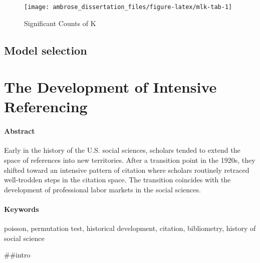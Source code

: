 \documentclass[]{book}
\theoremstyle{definition}
\theoremstyle{definition}
\theoremstyle{definition}
\theoremstyle{remark}
\begin{document}
\begin{figure}

{\centering \texttt{[image: ambrose\_dissertation\_files/figure-latex/mlk-tab-1]} 

}

\caption{Significant Counts of K}\label{fig:mlk-tab}
\end{figure}

\hypertarget{model-selection}{%
\section{Model selection}\label{model-selection}}

\hypertarget{ten}{%
\chapter{The Development of Intensive Referencing}\label{ten}}

\hypertarget{abstract-4}{%
\subsubsection*{Abstract}\label{abstract-4}}


Early in the history of the U.S. social sciences, scholars
tended to extend the space of references into new territories. After a
transition point in the 1920s, they shifted toward an intensive pattern
of citation where scholars routinely retraced well-trodden steps in the
citation space. The transition coincides with the development of
professional labor markets in the social sciences.

\hypertarget{keywords-4}{%
\subsubsection*{Keywords}\label{keywords-4}}


poisson, permutation test, historical development,
citation, bibliometry, history of social science

\#\#intro
\end{document}
